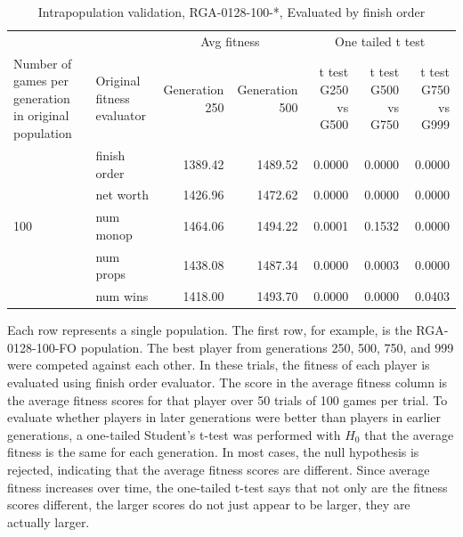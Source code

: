\begin{table}[htbp]
  \centering
  \caption{Intrapopulation validation, RGA-0128-100-*, Evaluated by finish
  order}
    \begin{tabularx}{\linewidth}{|p{1in}|p{1in}|r|r|r|r|r|}
    \cline{3-7}
    \multicolumn{1}{l}{} &  & \multicolumn{2}{c|}{Avg fitness} & \multicolumn{3}{c|}{One tailed t test} \\
    \cline{1-7}
    Number of games per generation in original population
    & Original fitness evaluator
    & \multicolumn{1}{p{0.7in}|}{Generation 250}
    & \multicolumn{1}{p{0.7in}|}{Generation 500}
    & \multicolumn{1}{X|}{t test G250 vs G500}
    & \multicolumn{1}{X|}{t test G500 vs G750}
    & \multicolumn{1}{X|}{t test G750 vs G999} \\
    \cline{1-7}
      \multirow{5}{*}{100}
      & finish order & 1389.42 & 1489.52 & 0.0000 & 0.0000 & 0.0000 \\
      \cline{2-7}
      & net worth & 1426.96 & 1472.62 & 0.0000 & 0.0000 & 0.0000 \\
      \cline{2-7}
      & num monop & 1464.06 & 1494.22 & 0.0001 & 0.1532 & 0.0000 \\
      \cline{2-7}
      & num props & 1438.08 & 1487.34 & 0.0000 & 0.0003 & 0.0000 \\
      \cline{2-7}
      & num wins & 1418.00 & 1493.70 & 0.0000 & 0.0000 & 0.0403 \\
      \cline{1-7}
    \end{tabularx}%
  \label{tab:validationRGA0128}%
\end{table}%

Each row represents a single population. The first row, for example, is the
RGA-0128-100-FO population. The best player from generations 250, 500, 750, and
999 were competed against each other. In these trials, the fitness of each
player is evaluated using finish order evaluator. The score in the average
fitness column is the average fitness scores for that player over 50 trials of
100 games per trial. To evaluate whether players in later generations were
better than players in earlier generations, a one-tailed Student's t-test was
performed with $H_{0}$ that the average fitness is the same for each generation.
In most cases, the null hypothesis is rejected, indicating that the average
fitness scores are different. Since average fitness increases over time, the
one-tailed t-test says that not only are the fitness scores different, the
larger scores do not just appear to be larger, they are actually larger.

